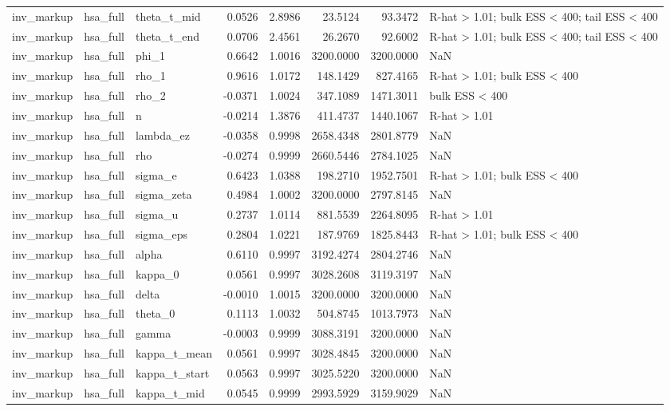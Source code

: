 \begin{tabular}{lllrrrrl}
inv\_markup & hsa\_full & theta\_t\_mid & 0.0526 & 2.8986 & 23.5124 & 93.3472 & R-hat > 1.01; bulk ESS < 400; tail ESS < 400 \\
inv\_markup & hsa\_full & theta\_t\_end & 0.0706 & 2.4561 & 26.2670 & 92.6002 & R-hat > 1.01; bulk ESS < 400; tail ESS < 400 \\
inv\_markup & hsa\_full & phi\_1 & 0.6642 & 1.0016 & 3200.0000 & 3200.0000 & NaN \\
inv\_markup & hsa\_full & rho\_1 & 0.9616 & 1.0172 & 148.1429 & 827.4165 & R-hat > 1.01; bulk ESS < 400 \\
inv\_markup & hsa\_full & rho\_2 & -0.0371 & 1.0024 & 347.1089 & 1471.3011 & bulk ESS < 400 \\
inv\_markup & hsa\_full & n & -0.0214 & 1.3876 & 411.4737 & 1440.1067 & R-hat > 1.01 \\
inv\_markup & hsa\_full & lambda\_ez & -0.0358 & 0.9998 & 2658.4348 & 2801.8779 & NaN \\
inv\_markup & hsa\_full & rho & -0.0274 & 0.9999 & 2660.5446 & 2784.1025 & NaN \\
inv\_markup & hsa\_full & sigma\_e & 0.6423 & 1.0388 & 198.2710 & 1952.7501 & R-hat > 1.01; bulk ESS < 400 \\
inv\_markup & hsa\_full & sigma\_zeta & 0.4984 & 1.0002 & 3200.0000 & 2797.8145 & NaN \\
inv\_markup & hsa\_full & sigma\_u & 0.2737 & 1.0114 & 881.5539 & 2264.8095 & R-hat > 1.01 \\
inv\_markup & hsa\_full & sigma\_eps & 0.2804 & 1.0221 & 187.9769 & 1825.8443 & R-hat > 1.01; bulk ESS < 400 \\
inv\_markup & hsa\_full & alpha & 0.6110 & 0.9997 & 3192.4274 & 2804.2746 & NaN \\
inv\_markup & hsa\_full & kappa\_0 & 0.0561 & 0.9997 & 3028.2608 & 3119.3197 & NaN \\
inv\_markup & hsa\_full & delta & -0.0010 & 1.0015 & 3200.0000 & 3200.0000 & NaN \\
inv\_markup & hsa\_full & theta\_0 & 0.1113 & 1.0032 & 504.8745 & 1013.7973 & NaN \\
inv\_markup & hsa\_full & gamma & -0.0003 & 0.9999 & 3088.3191 & 3200.0000 & NaN \\
inv\_markup & hsa\_full & kappa\_t\_mean & 0.0561 & 0.9997 & 3028.4845 & 3200.0000 & NaN \\
inv\_markup & hsa\_full & kappa\_t\_start & 0.0563 & 0.9997 & 3025.5220 & 3200.0000 & NaN \\
inv\_markup & hsa\_full & kappa\_t\_mid & 0.0545 & 0.9999 & 2993.5929 & 3159.9029 & NaN \\

\end{tabular}
